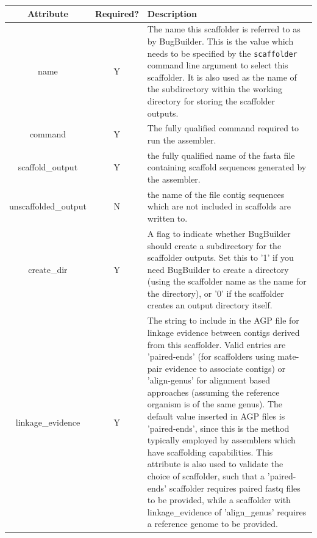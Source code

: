 \documentclass[a4paper,10pt]{article}
\begin{document}
\begin{table}[htb]
  \begin{tabular}{c  c p{10cm}}
    \textbf{Attribute} &  \textbf{ Required?}  & \textbf{Description}  \\
    \hline
name & Y & The name this scaffolder is referred to as by BugBuilder. This is the value which
needs to be specified by the {\tt scaffolder} command line argument to select this scaffolder. It is
also used as the name of the subdirectory within the working directory for storing the scaffolder 
outputs.\\
command & Y & The fully qualified command required to run the assembler.\\
scaffold\_output & Y &  the fully qualified name of the fasta file containing
scaffold sequences generated by the assembler.\\
unscaffolded\_output & N & the name of the file contig sequences which are not
included in scaffolds are written to.\\
create\_dir & Y & A flag to indicate whether BugBuilder should create a subdirectory for the
scaffolder outputs. Set this to '1' if you need BugBuilder to create a directory (using the
scaffolder name as the name for the directory), or '0' if the scaffolder creates an output
directory itself. \\
linkage\_evidence & Y & The string to include in the AGP file for linkage evidence between
contigs derived from this scaffolder. Valid entries are 'paired-ends' (for scaffolders using
mate-pair evidence to associate contigs) or 'align-genus' for alignment based approaches (assuming
the reference organism is of the same genus). The default value inserted in AGP files is
'paired-ends', since this is the method typically employed by assemblers which have scaffolding
capabilities. This attribute is also used to validate the choice of scaffolder, such that a
'paired-ends' scaffolder requires paired fastq files to be provided, while a scaffolder with
linkage\_evidence of 'align\_genus' requires a reference genome to be provided.\\ 
  \end{tabular}
  \label{tab:scaffatt}
\end{table}
\end{document}
